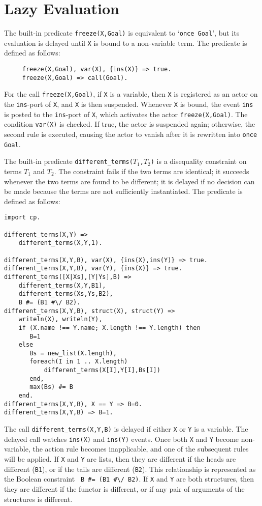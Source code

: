 \section{Lazy Evaluation}
The built-in predicate \texttt{freeze(X,Goal)} is equivalent to `\texttt{once Goal}', but its evaluation is delayed until \texttt{X} is bound to a non-variable term. The predicate is defined as follows:
\begin{verbatim}
     freeze(X,Goal), var(X), {ins(X)} => true.
     freeze(X,Goal) => call(Goal).
\end{verbatim}
For the call \texttt{freeze(X,Goal)}, if  \texttt{X} is a variable, then \texttt{X} is registered as an actor on the \texttt{ins}-port of \texttt{X}, and \texttt{X} is then suspended. Whenever \texttt{X} is bound, the event \texttt{ins} is posted to the \texttt{ins}-port of \texttt{X}, which activates the actor \texttt{freeze(X,Goal)}. The condition \texttt{var(X)} is checked. If true, the actor is suspended again; otherwise, the second rule is executed, causing the actor to vanish after it is rewritten into \texttt{once Goal}.

The built-in predicate \texttt{different\_terms($T_1$,$T_2$)} is a disequality constraint on terms $T_1$ and $T_2$. The constraint fails if the two terms are identical; it succeeds whenever the two terms are found to be different; it is delayed if no decision can be made because the terms are not sufficiently instantiated. The predicate is defined as follows:
\begin{verbatim}
import cp.

different_terms(X,Y) =>
    different_terms(X,Y,1).

different_terms(X,Y,B), var(X), {ins(X),ins(Y)} => true.
different_terms(X,Y,B), var(Y), {ins(X)} => true.
different_terms([X|Xs],[Y|Ys],B) =>
    different_terms(X,Y,B1),
    different_terms(Xs,Ys,B2),
    B #= (B1 #\/ B2).
different_terms(X,Y,B), struct(X), struct(Y) =>
    writeln(X), writeln(Y),											  
    if (X.name !== Y.name; X.length !== Y.length) then
       B=1
    else
       Bs = new_list(X.length),
       foreach(I in 1 .. X.length)
           different_terms(X[I],Y[I],Bs[I])
       end,
       max(Bs) #= B
    end.
different_terms(X,Y,B), X == Y => B=0.
different_terms(X,Y,B) => B=1.
\end{verbatim}
The call \texttt{different\_terms(X,Y,B)} is delayed if either \texttt{X} or \texttt{Y} is a variable. The delayed call watches \texttt{ins(X)} and  \texttt{ins(Y)} events. Once both \texttt{X} and \texttt{Y} become non-variable, the action rule becomes inapplicable, and one of the subsequent rules will be applied. If \texttt{X} and \texttt{Y} are lists, then they are different if the heads are different (\verb+B1+), or if the tails are different (\verb+B2+).  This relationship is represented as the Boolean constraint \verb+ B #= (B1 #\/ B2)+. If \texttt{X} and \texttt{Y} are both structures, then they are different if the functor is different, or if any pair of arguments of the structures is different.


